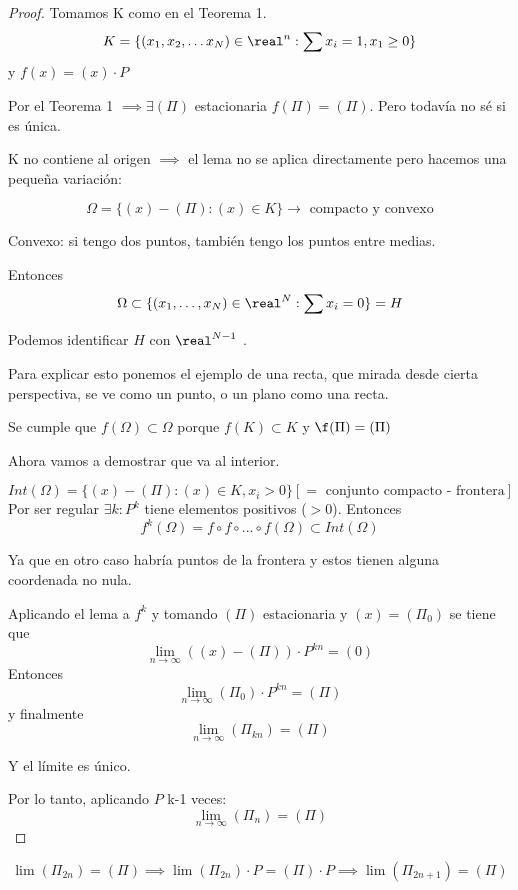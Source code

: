\begin{proof}
	Tomamos K como en el Teorema 1.
		$$K = \{(x_1 , x_2, \ldots x_N) \in \real^n : \sum x_i = 1 , x_1 \geq 0\}$$
	y $f(x) = (x)\cdot P$

	Por el Teorema 1 $\implies \exists (\Pi)$ estacionaria $f(\Pi) = (\Pi)$. Pero todavía no sé si es única.

	\obs K no contiene al origen $\implies$ el lema no se aplica directamente pero hacemos una pequeña variación:

	$$\Omega = \{(x) - (\Pi) : (x) \in K\} \rightarrow \text{ compacto y convexo}$$

	Convexo: si tengo dos puntos, también tengo los puntos entre medias.


	Entonces
	$$\Omega \subset \{(x_1 , \ldots , x_N) \in \real^N : \sum x_i = 0\} = H$$

	Podemos identificar $H$ con $\real^{N-1}$ .

	Para explicar esto ponemos el ejemplo de una recta, que mirada desde cierta perspectiva, se ve como un punto, o un plano como una recta.

	Se cumple que $f(\Omega) \subset \Omega$ porque $f(K) \subset K$ y $\f(\Pi) = (\Pi)$

	Ahora vamos a demostrar que va al interior.

	$$Int(\Omega) = \{(x) - (\Pi) : (x) \in K, x_i >0\} [ = \text{ conjunto compacto - frontera}]$$
Por ser regular $\exists k : P^k$ tiene elementos positivos ($>0$). Entonces
$$f^k(\Omega) = f \circ f\circ . . . \circ f(\Omega) \subset Int(\Omega)$$

Ya que en otro caso habría puntos de la frontera y estos tienen alguna coordenada no nula.

Aplicando el lema a $f^k$ y tomando $(\Pi)$ estacionaria y $(x) = (\Pi_0)$ se tiene que
$$\lim_{n \rightarrow \infty} ((x) - (\Pi)) \cdot P^{kn} = (0)$$
Entonces
$$\lim_{n \rightarrow \infty} (\Pi_0) \cdot P^{kn} = (\Pi)$$
y finalmente
$$\lim_{n \rightarrow \infty} (\Pi_{kn}) = (\Pi)$$

Y el límite es único.

Por lo tanto, aplicando $P$ k-1 veces:
$$\lim_{n \rightarrow \infty} (\Pi_{n}) = (\Pi)$$
\end{proof}

\begin{example}
	$$\lim(\Pi_{2n}) = (\Pi) \implies \lim (\Pi_{2n})\cdot P = (\Pi)\cdot P \implies \lim(\Pi_{2n +1}) = (\Pi)$$
\end{example}


